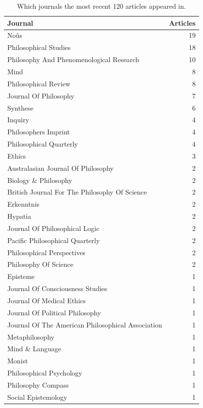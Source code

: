 \documentclass[
  10pt,
  letterpaper,
  DIV=11,
  numbers=noendperiod,
  twoside]{scrartcl}
\begin{document}
\begin{longtable}[]{@{}lr@{}}

\caption{\label{tbl-recent-journals-in-main-bib}Which journals the most
recent 120 articles appeared in.}

\tabularnewline

\toprule\noalign{}
Journal & Articles \\
\midrule\noalign{}
\endhead
\bottomrule\noalign{}
\endlastfoot
Noûs & 19 \\
Philosophical Studies & 18 \\
Philosophy And Phenomenological Research & 10 \\
Mind & 8 \\
Philosophical Review & 8 \\
Journal Of Philosophy & 7 \\
Synthese & 6 \\
Inquiry & 4 \\
Philosophers Imprint & 4 \\
Philosophical Quarterly & 4 \\
Ethics & 3 \\
Australasian Journal Of Philosophy & 2 \\
Biology \& Philosophy & 2 \\
British Journal For The Philosophy Of Science & 2 \\
Erkenntnis & 2 \\
Hypatia & 2 \\
Journal Of Philosophical Logic & 2 \\
Pacific Philosophical Quarterly & 2 \\
Philosophical Perspectives & 2 \\
Philosophy Of Science & 2 \\
Episteme & 1 \\
Journal Of Consciousness Studies & 1 \\
Journal Of Medical Ethics & 1 \\
Journal Of Political Philosophy & 1 \\
Journal Of The American Philosophical Association & 1 \\
Metaphilosophy & 1 \\
Mind \& Language & 1 \\
Monist & 1 \\
Philosophical Psychology & 1 \\
Philosophy Compass & 1 \\
Social Epistemology & 1 \\

\end{longtable}
\end{document}
